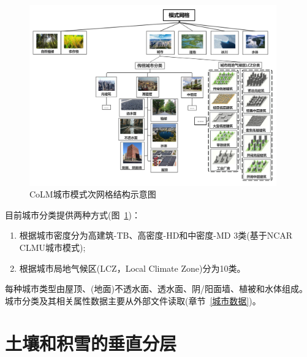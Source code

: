 {
\begin{figure}[htbp]
\centering
\includegraphics[width=0.95\textwidth]{Figures/模式构架/CoLM城市次网格示意图.jpg}
\caption[CoLM城市模式次网格结构示意图]{CoLM城市模式次网格结构示意图}
\label{fig:城市次网格}
\end{figure}
}

目前城市分类提供两种方式(图~\ref{fig:城市次网格})：
\begin{enumerate}
    \item 根据城市密度分为高建筑-TB、高密度-HD和中密度-MD 3类(基于NCAR CLMU城市模式);
    \item 根据城市局地气候区(LCZ，Local Climate Zone)分为10类。
\end{enumerate}
每种城市类型由屋顶、(地面)不透水面、透水面、阴/阳面墙、植被和水体组成。
城市分类及其相关属性数据主要从外部文件读取(章节~\ref{城市数据})。

\section{土壤和积雪的垂直分层}\label{土壤和积雪的垂直分层}

